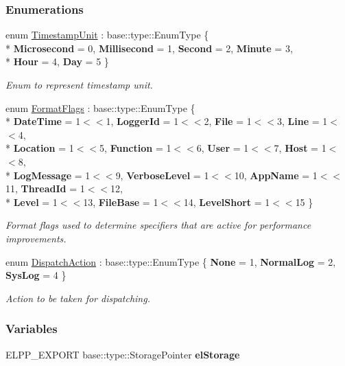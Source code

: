 \subsubsection*{Enumerations}
\begin{DoxyCompactItemize}
\item 
\hypertarget{a00184_a1b886858c6409097395b24b1bdf03c39}{}enum \hyperlink{a00184_a1b886858c6409097395b24b1bdf03c39}{Timestamp\+Unit} \+: base\+::type\+::\+Enum\+Type \{ \\*
{\bfseries Microsecond} = 0, 
{\bfseries Millisecond} = 1, 
{\bfseries Second} = 2, 
{\bfseries Minute} = 3, 
\\*
{\bfseries Hour} = 4, 
{\bfseries Day} = 5
 \}\label{a00184_a1b886858c6409097395b24b1bdf03c39}

\begin{DoxyCompactList}\small\item\em Enum to represent timestamp unit. \end{DoxyCompactList}\item 
\hypertarget{a00184_a28939c5a884e67fcf12259f4b8848e00}{}enum \hyperlink{a00184_a28939c5a884e67fcf12259f4b8848e00}{Format\+Flags} \+: base\+::type\+::\+Enum\+Type \{ \\*
{\bfseries Date\+Time} = 1$<$$<$1, 
{\bfseries Logger\+Id} = 1$<$$<$2, 
{\bfseries File} = 1$<$$<$3, 
{\bfseries Line} = 1$<$$<$4, 
\\*
{\bfseries Location} = 1$<$$<$5, 
{\bfseries Function} = 1$<$$<$6, 
{\bfseries User} = 1$<$$<$7, 
{\bfseries Host} = 1$<$$<$8, 
\\*
{\bfseries Log\+Message} = 1$<$$<$9, 
{\bfseries Verbose\+Level} = 1$<$$<$10, 
{\bfseries App\+Name} = 1$<$$<$11, 
{\bfseries Thread\+Id} = 1$<$$<$12, 
\\*
{\bfseries Level} = 1$<$$<$13, 
{\bfseries File\+Base} = 1$<$$<$14, 
{\bfseries Level\+Short} = 1$<$$<$15
 \}\label{a00184_a28939c5a884e67fcf12259f4b8848e00}

\begin{DoxyCompactList}\small\item\em Format flags used to determine specifiers that are active for performance improvements. \end{DoxyCompactList}\item 
\hypertarget{a00184_a3aa2563d38e47388ba242a1694fc2839}{}enum \hyperlink{a00184_a3aa2563d38e47388ba242a1694fc2839}{Dispatch\+Action} \+: base\+::type\+::\+Enum\+Type \{ {\bfseries None} = 1, 
{\bfseries Normal\+Log} = 2, 
{\bfseries Sys\+Log} = 4
 \}\label{a00184_a3aa2563d38e47388ba242a1694fc2839}

\begin{DoxyCompactList}\small\item\em Action to be taken for dispatching. \end{DoxyCompactList}\end{DoxyCompactItemize}
\subsubsection*{Variables}
\begin{DoxyCompactItemize}
\item 
\hypertarget{a00184_a0ec6b7a1bd89ad58dadc10f190142018}{}E\+L\+P\+P\+\_\+\+E\+X\+P\+O\+R\+T base\+::type\+::\+Storage\+Pointer {\bfseries el\+Storage}\label{a00184_a0ec6b7a1bd89ad58dadc10f190142018}

\end{DoxyCompactItemize}
